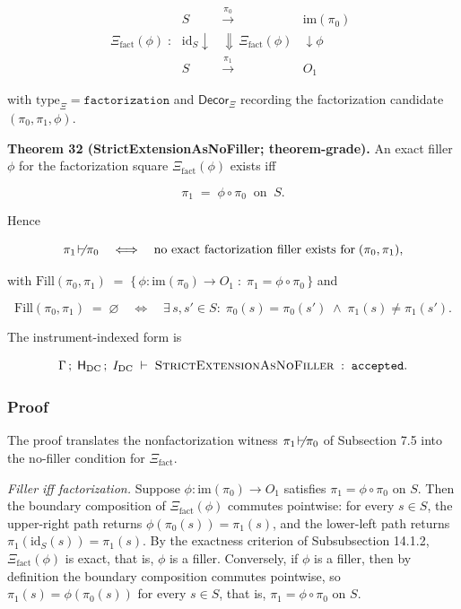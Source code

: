 \documentclass[11pt]{article}
\providecommand{\factor}{\mathrel{\!\vdash\!}}
\theoremstyle{definition}
\begin{document}
\[
\Xi_{\mathrm{fact}}(\phi)\;:\;
\begin{array}{ccc}
S & \xrightarrow{\pi_{0}} & \mathrm{im}(\pi_{0})\\
{\scriptstyle\mathrm{id}_{S}}\downarrow & \Downarrow\,\Xi_{\mathrm{fact}}(\phi) & \downarrow{\scriptstyle\phi}\\
S & \xrightarrow{\pi_{1}} & O_{1}
\end{array}
\]

with \(\mathrm{type}_{\Xi}=\texttt{factorization}\) and \(\mathsf{Decor}_{\Xi}\) recording the factorization candidate \((\pi_{0},\pi_{1},\phi)\).

\textbf{Theorem 32 (StrictExtensionAsNoFiller; theorem-grade).} An exact filler \(\phi\) for the factorization square \(\Xi_{\mathrm{fact}}(\phi)\) exists iff

\[
\pi_{1}\;=\;\phi\circ\pi_{0}\;\;\text{on}\;\;S.
\]

Hence

\[
\pi_{1}\not\factor\pi_{0}\quad\Longleftrightarrow\quad\text{no exact factorization filler exists for}\;(\pi_{0},\pi_{1}),
\]

with \(\mathrm{Fill}(\pi_{0},\pi_{1})\;=\;\bigl\{\,\phi:\mathrm{im}(\pi_{0})\to O_{1}\;:\;\pi_{1}=\phi\circ\pi_{0}\,\bigr\}\) and

\[
\mathrm{Fill}(\pi_{0},\pi_{1})\;=\;\varnothing\quad\Longleftrightarrow\quad\exists\,s,s'\in S:\;\pi_{0}(s)=\pi_{0}(s')\;\land\;\pi_{1}(s)\neq\pi_{1}(s').
\]

The instrument-indexed form is

\[
\Gamma\,;\;\mathsf H_{\mathrm{DC}}\,;\;I_{\mathrm{DC}}\;\vdash\;\textsc{StrictExtensionAsNoFiller}\;:\;\texttt{accepted}.
\]

\subsubsection{Proof}

The proof translates the nonfactorization witness \(\pi_{1}\not\factor\pi_{0}\) of Subsection 7.5 into the no-filler condition for \(\Xi_{\mathrm{fact}}\).

\emph{Filler iff factorization.} Suppose \(\phi:\mathrm{im}(\pi_{0})\to O_{1}\) satisfies \(\pi_{1}=\phi\circ\pi_{0}\) on \(S\). Then the boundary composition of \(\Xi_{\mathrm{fact}}(\phi)\) commutes pointwise: for every \(s\in S\), the upper-right path returns \(\phi(\pi_{0}(s))=\pi_{1}(s)\), and the lower-left path returns \(\pi_{1}(\mathrm{id}_{S}(s))=\pi_{1}(s)\). By the exactness criterion of Subsubsection 14.1.2, \(\Xi_{\mathrm{fact}}(\phi)\) is exact, that is, \(\phi\) is a filler. Conversely, if \(\phi\) is a filler, then by definition the boundary composition commutes pointwise, so \(\pi_{1}(s)=\phi(\pi_{0}(s))\) for every \(s\in S\), that is, \(\pi_{1}=\phi\circ\pi_{0}\) on \(S\).
\end{document}
